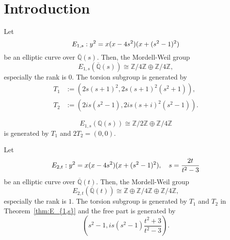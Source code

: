 \documentclass[main]{subfiles}
\begin{document}
\chapter{Introduction}

\begin{thm}
    \label{thm:E_{1,s}}
    Let
    \begin{equation}
        \label{eq:E_{1s}}
        E_{1,s}: y^{2} = x(x - 4s^{2})(x + (s^{2} - 1)^{2})
    \end{equation}
    be an elliptic curve over $\overline{\mathbb{Q}}(s)$.
    Then, the Mordell-Weil group
    \begin{equation}
        E_{1,s}(\overline{\mathbb{Q}}(s)) \cong \mathbb{Z} / 4 \mathbb{Z} \oplus \mathbb{Z} / 4 \mathbb{Z},
    \end{equation}
    especially the rank is $0$. The torsion subgroup is generated by
    \begin{align}
        T_1 & := (2s(s+1)^2, 2s(s+1)^2(s^2+1)),   \\
        T_2 & := (2is(s^2-1),2is(s+i)^2(s^2-1)).
    \end{align}
\end{thm}

\begin{cor}
    \begin{equation}
        E_{1,s}(\mathbb{Q}(s)) \cong \mathbb{Z} / 2 \mathbb{Z} \oplus \mathbb{Z} / 4 \mathbb{Z}
    \end{equation}
    is generated by $T_1$ and $2T_2=(0,0)$.
\end{cor}

\begin{thm}
    \label{thm:E_{2,t}}
    Let 
    \begin{equation}
        \label{eq:E_{4t}}
        E_{2,t}: y^{2} = x(x - 4s^{2})(x + (s^{2} - 1)^{2}),\quad s = \frac{2t}{t^{2} - 3}
    \end{equation}
    be an elliptic curve over $\overline{\mathbb{Q}}(t)$.
    Then, the Mordell-Weil group
    \begin{equation}
        E_{2,t}(\overline{\mathbb{Q}}(t)) \cong \mathbb{Z} \oplus \mathbb{Z} / 4 \mathbb{Z} \oplus \mathbb{Z} / 4 \mathbb{Z},
    \end{equation}
    especially the rank is $1$.
    The torsion subgroup is generated by $T_1$ and $T_2$ in Theorem~\ref{thm:E_{1,s}} and the free part is generated by
    \begin{equation}
        \left(s^{2} - 1, i s(s^{2} - 1) \frac{t^{2} + 3}{t^{2} - 3} \right).
    \end{equation}
\end{thm}
\end{document}
